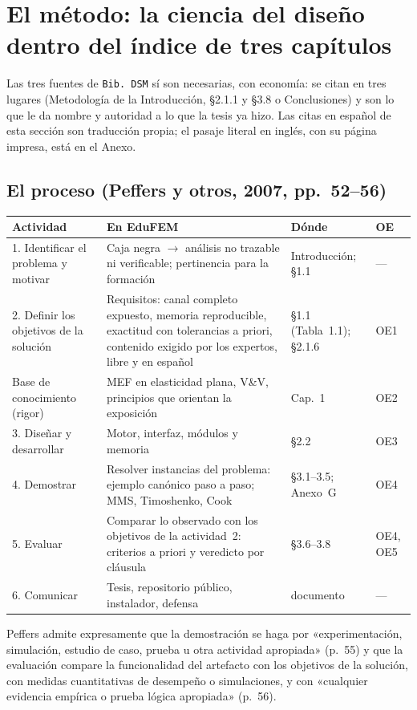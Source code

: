 \documentclass[11pt,a4paper]{article}
\begin{document}
\section{El método: la ciencia del diseño dentro del índice de tres capítulos}
\label{sec:dsm}

Las tres fuentes de \texttt{Bib.~DSM} sí son necesarias, con economía: se citan en tres lugares (Metodología de la Introducción, §2.1.1 y §3.8 o Conclusiones) y son lo que le da nombre y autoridad a lo que la tesis ya hizo. Las citas en español de esta sección son traducción propia; el pasaje literal en inglés, con su página impresa, está en el Anexo.

\subsection{El proceso (Peffers y otros, 2007, pp.~52--56)}

{\small
\begin{longtable}{L{4.1cm}L{6.6cm}L{3.0cm}L{1.6cm}}
\toprule
\textbf{Actividad} & \textbf{En EduFEM} & \textbf{Dónde} & \textbf{OE} \\
\midrule
{}. Identificar el problema y motivar & Caja negra $\to$ análisis no trazable ni verificable; pertinencia para la formación & Introducción; §1.1 & --- \\
2. Definir los objetivos de la solución & Requisitos: canal completo expuesto, memoria reproducible, exactitud con tolerancias a priori, contenido exigido por los expertos, libre y en español & §1.1 (Tabla~1.1); §2.1.6 & OE1 \\
Base de conocimiento (rigor) & MEF en elasticidad plana, V\&V, principios que orientan la exposición & Cap.~1 & OE2 \\
3. Diseñar y desarrollar & Motor, interfaz, módulos y memoria & §2.2 & OE3 \\
4. Demostrar & Resolver instancias del problema: ejemplo canónico paso a paso; MMS, Timoshenko, Cook & §3.1--3.5; Anexo~G & OE4 \\
5. Evaluar & Comparar lo observado con los objetivos de la actividad~2: criterios a priori y veredicto por cláusula & §3.6--3.8 & OE4, OE5 \\
6. Comunicar & Tesis, repositorio público, instalador, defensa & documento & --- \\
\bottomrule
\end{longtable}}

Peffers admite expresamente que la demostración se haga por «experimentación, simulación, estudio de caso, prueba u otra actividad apropiada» (p.~55) y que la evaluación compare la funcionalidad del artefacto con los objetivos de la solución, con medidas cuantitativas de desempeño o simulaciones, y con «cualquier evidencia empírica o prueba lógica apropiada» (p.~56).
\end{document}

